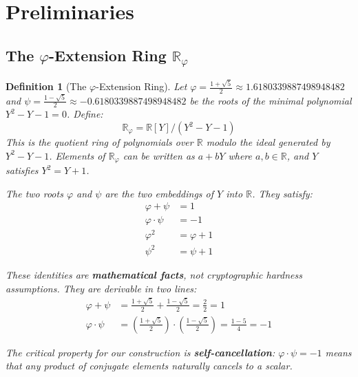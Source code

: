 \documentclass[11pt,a4paper]{article}
\newtheorem{definition}[theorem]{Definition}
\begin{document}
\section{Preliminaries}

\subsection{The $\varphi$-Extension Ring $\mathbb{R}_\varphi$}

\begin{definition}[The $\varphi$-Extension Ring]
Let $\varphi = \frac{1 + \sqrt{5}}{2} \approx 1.6180339887498948482$ and $\psi = \frac{1 - \sqrt{5}}{2} \approx -0.6180339887498948482$ be the roots of the minimal polynomial $Y^2 - Y - 1 = 0$. Define:
\begin{equation}
\mathbb{R}_\varphi = \mathbb{R}[Y] / (Y^2 - Y - 1)
\end{equation}
This is the quotient ring of polynomials over $\mathbb{R}$ modulo the ideal generated by $Y^2 - Y - 1$. Elements of $\mathbb{R}_\varphi$ can be written as $a + bY$ where $a, b \in \mathbb{R}$, and $Y$ satisfies $Y^2 = Y + 1$.

The two roots $\varphi$ and $\psi$ are the two embeddings of $Y$ into $\mathbb{R}$. They satisfy:
\begin{align}
\varphi + \psi &= 1 \label{eq:sum2} \\
\varphi \cdot \psi &= -1 \label{eq:product2} \\
\varphi^2 &= \varphi + 1 \label{eq:phisq} \\
\psi^2 &= \psi + 1 \label{eq:psisq}
\end{align}

These identities are \textbf{mathematical facts}, not cryptographic hardness assumptions. They are derivable in two lines:
\begin{align*}
\varphi + \psi &= \frac{1+\sqrt{5}}{2} + \frac{1-\sqrt{5}}{2} = \frac{2}{2} = 1 \\
\varphi \cdot \psi &= \left(\frac{1+\sqrt{5}}{2}\right) \cdot \left(\frac{1-\sqrt{5}}{2}\right) = \frac{1 - 5}{4} = -1
\end{align*}

The critical property for our construction is \textbf{self-cancellation}: $\varphi \cdot \psi = -1$ means that any product of conjugate elements naturally cancels to a scalar.
\end{definition}
\end{document}
